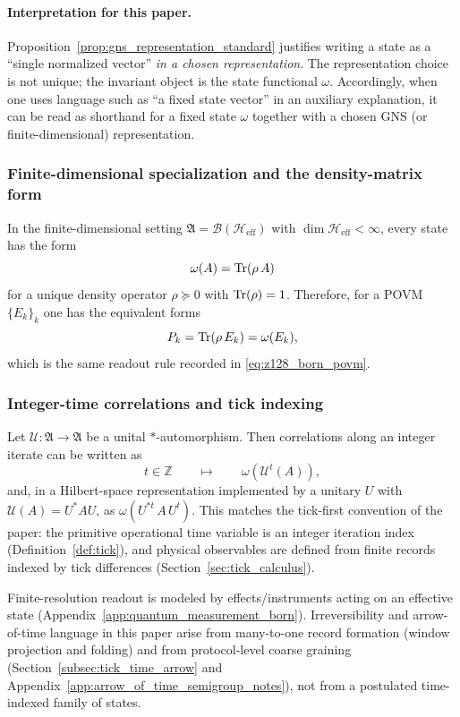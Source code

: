 \paragraph{Interpretation for this paper.}
\InterfaceTag Proposition~\ref{prop:gns_representation_standard} justifies writing a state as a ``single normalized vector'' \emph{in a chosen representation}.
The representation choice is not unique; the invariant object is the state functional $\omega$.
Accordingly, when one uses language such as ``a fixed state vector'' in an auxiliary explanation, it can be read as shorthand for a fixed state $\omega$ together with a chosen GNS (or finite-dimensional) representation.

\subsubsection{Finite-dimensional specialization and the density-matrix form}
\label{subsec:state_density_matrix_specialization}

In the finite-dimensional setting $\mathfrak{A}=\mathcal{B}(\mathcal{H}_{\mathrm{eff}})$ with $\dim\mathcal{H}_{\mathrm{eff}}<\infty$, every state has the form
\[
\omega(A)=\mathrm{Tr}(\rho\,A)
\]
for a unique density operator $\rho\succeq 0$ with $\mathrm{Tr}(\rho)=1$.
Therefore, for a POVM $\{E_k\}_k$ one has the equivalent forms
\[
P_k=\mathrm{Tr}(\rho\,E_k)=\omega(E_k),
\]
which is the same readout rule recorded in \eqref{eq:z128_born_povm}.

\subsubsection{Integer-time correlations and tick indexing}
\label{subsec:state_tick_correlators}

Let $\mathcal{U}:\mathfrak{A}\to\mathfrak{A}$ be a unital $*$-automorphism.
Then correlations along an integer iterate can be written as
\[
t\in\mathbb{Z}
\qquad\mapsto\qquad
\omega\!\left(\mathcal{U}^{t}(A)\right),
\]
and, in a Hilbert-space representation implemented by a unitary $U$ with $\mathcal{U}(A)=U^{*}AU$, as $\omega(U^{*t}\,A\,U^{t})$.
This matches the tick-first convention of the paper: the primitive operational time variable is an integer iteration index (Definition~\ref{def:tick}), and physical observables are defined from finite records indexed by tick differences (Section~\ref{sec:tick_calculus}).
\par
\InterfaceTag Finite-resolution readout is modeled by effects/instruments acting on an effective state (Appendix~\ref{app:quantum_measurement_born}).
Irreversibility and arrow-of-time language in this paper arise from many-to-one record formation (window projection and folding) and from protocol-level coarse graining (Section~\ref{subsec:tick_time_arrow} and Appendix~\ref{app:arrow_of_time_semigroup_notes}), not from a postulated time-indexed family of states.


